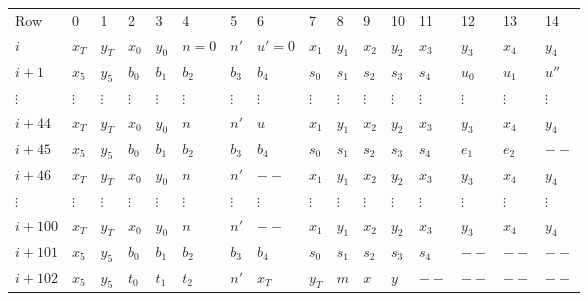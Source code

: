 \begin{center}
    \begin{table}[H]
        \begin{tabular}{llllllllllllllll}
            Row     & 0        & 1        & 2        & 3        & 4        & 5        & 6        & 7        & 8        & 9        & 10       & 11       & 12       & 13       & 14       \\
            $i$    & $x_T$    & $y_T$    & $x_0$    & $y_0$    & $n = 0$    & $n'$    & $u'=0$    & $x_1$    & $y_1$    & $x_2$    & $y_2$    & $x_3$    & $y_3$ & $x_4$ & $y_4$ \\
            $i + 1$   & $x_5$    & $y_5$    & $b_0$    & $b_1$    & $b_2$    & $b_3$    & $b_4$      & $s_0$    & $s_1$    & $s_2$    & $s_3$    & $s_4$    & $u_0$ & $u_1$ & $u''$ \\
            $\vdots$  & $\vdots$ & $\vdots$ & $\vdots$ & $\vdots$ & $\vdots$ & $\vdots$ & $\vdots$ & $\vdots$ & $\vdots$ & $\vdots$ & $\vdots$ & $\vdots$ & $\vdots$ & $\vdots$ & $\vdots$ \\
            $i+44$    & $x_T$    & $y_T$    & $x_0$    & $y_0$    & $n$    & $n'$    & $u$    & $x_1$    & $y_1$    & $x_2$    & $y_2$    & $x_3$    & $y_3$ & $x_4$ & $y_4$ \\
            $i + 45$   & $x_5$    & $y_5$    & $b_0$    & $b_1$    & $b_2$    & $b_3$    & $b_4$      & $s_0$    & $s_1$    & $s_2$    & $s_3$    & $s_4$    & $e_1$ & $e_2$ & $--$ \\
            $i+46$    & $x_T$    & $y_T$    & $x_0$    & $y_0$    & $n$    & $n'$    & $--$    & $x_1$    & $y_1$    & $x_2$    & $y_2$    & $x_3$    & $y_3$ & $x_4$ & $y_4$ \\
            $\vdots$  & $\vdots$ & $\vdots$ & $\vdots$ & $\vdots$ & $\vdots$ & $\vdots$ & $\vdots$ & $\vdots$ & $\vdots$ & $\vdots$ & $\vdots$ & $\vdots$ & $\vdots$ & $\vdots$ & $\vdots$ \\
            $i + 100$ & $x_T$    & $y_T$    & $x_0$    & $y_0$    & $n$    & $n'$    & $--$    & $x_1$    & $y_1$    & $x_2$    & $y_2$    & $x_3$    & $y_3$ & $x_4$ & $y_4$ \\
            $i + 101$ & $x_5$    & $y_5$    & $b_0$    & $b_1$    & $b_2$    & $b_3$    & $b_4$      & $s_0$    & $s_1$    & $s_2$    & $s_3$    & $s_4$    & $--$ & $--$ & $--$ \\
            $i + 102$ & $x_5$    & $y_5$    & $t_0$    & $t_1$    & $t_2$    & $n'$    & $x_T$      & $y_T$    & $m$    & $x$    & $y$    & $--$    & $--$ & $--$ & $--$ \\
        \end{tabular}
    \end{table}
\end{center}

